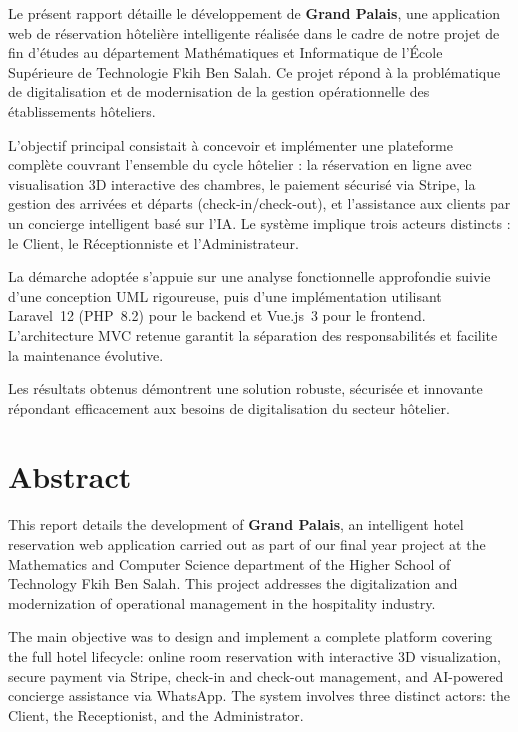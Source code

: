 \documentclass[12pt, a4paper]{report}
\begin{document}
Le présent rapport détaille le développement de \textbf{Grand Palais}, une application web
de réservation hôtelière intelligente réalisée dans le cadre de notre projet de fin
d'études au département Mathématiques et Informatique de l'École Supérieure de Technologie
Fkih Ben Salah. Ce projet répond à la problématique de digitalisation et de modernisation
de la gestion opérationnelle des établissements hôteliers.

L'objectif principal consistait à concevoir et implémenter une plateforme complète couvrant
l'ensemble du cycle hôtelier : la réservation en ligne avec visualisation 3D interactive
des chambres, le paiement sécurisé via Stripe, la gestion des arrivées et départs
(check-in/check-out), et l'assistance aux clients par un concierge intelligent basé
sur l'IA. Le système implique trois acteurs distincts : le Client, le Réceptionniste
et l'Administrateur.

La démarche adoptée s'appuie sur une analyse fonctionnelle approfondie suivie d'une
conception UML rigoureuse, puis d'une implémentation utilisant Laravel~12 (PHP~8.2)
pour le backend et Vue.js~3 pour le frontend. L'architecture MVC retenue garantit la
séparation des responsabilités et facilite la maintenance évolutive.

Les résultats obtenus démontrent une solution robuste, sécurisée et innovante répondant
efficacement aux besoins de digitalisation du secteur hôtelier.

\newpage

\chapter*{Abstract}
\thispagestyle{plain}

This report details the development of \textbf{Grand Palais}, an intelligent hotel
reservation web application carried out as part of our final year project at the
Mathematics and Computer Science department of the Higher School of Technology Fkih
Ben Salah. This project addresses the digitalization and modernization of operational
management in the hospitality industry.

The main objective was to design and implement a complete platform covering the full
hotel lifecycle: online room reservation with interactive 3D visualization, secure
payment via Stripe, check-in and check-out management, and AI-powered concierge
assistance via WhatsApp. The system involves three distinct actors: the Client,
the Receptionist, and the Administrator.
\end{document}
